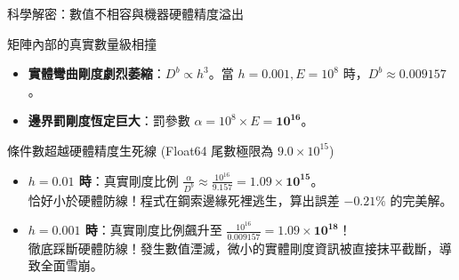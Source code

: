 \begin{frame}{科學解密：數值不相容與機器硬體精度溢出}
    \begin{block}{矩陣內部的真實數量級相撞}
        \begin{itemize}
            \item \textbf{實體彎曲剛度劇烈萎縮}：$D^b \propto h^3$。當 $h=0.001, E=10^8$ 時，$D^b \approx \mathbf{0.009157}$。
            \item \textbf{邊界罰剛度恆定巨大}：罰參數 $\alpha = 10^8 \times E = \mathbf{10^{16}}$。
        \end{itemize}
    \end{block}
    \begin{block}{條件數超越硬體精度生死線 (Float64 尾數極限為 $9.0 \times 10^{15}$)}
        \begin{itemize}
            \item \textbf{$h=0.01$ 時}：真實剛度比例 $\frac{\alpha}{D^b} \approx \frac{10^{16}}{9.157} = \mathbf{1.09 \times 10^{15}}$。\\
                  \alert{恰好小於硬體防線}！程式在鋼索邊緣死裡逃生，算出誤差 $-0.21\%$ 的完美解。
            \item \textbf{$h=0.001$ 時}：真實剛度比例飆升至 $\frac{10^{16}}{0.009157} = \mathbf{1.09 \times 10^{18}}$！\\
                  \alert{徹底踩斷硬體防線}！發生數值湮滅，微小的實體剛度資訊被直接抹平截斷，導致全面雪崩。
        \end{itemize}
    \end{block}
\end{frame}